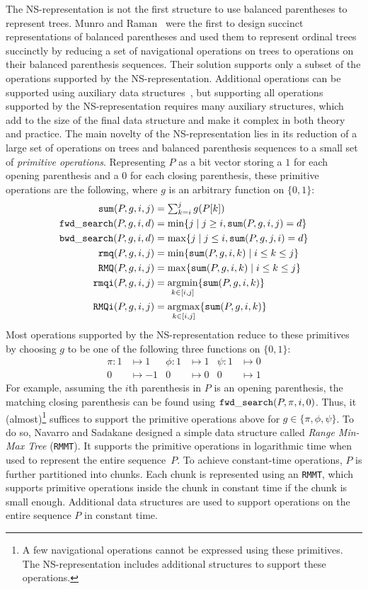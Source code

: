 The NS-representation is not the first structure to use balanced parentheses to
represent trees.
Munro and Raman~\cite{mr1997} were the first to design succinct representations
of balanced parentheses and used them to represent ordinal trees succinctly by
reducing a set of navigational operations on trees to operations on their
balanced parenthesis sequences.
Their solution supports only a subset of the operations supported by the
NS-representation.
Additional operations can be supported using auxiliary data
structures~\cite{ly2008}, but supporting all operations supported by the
NS-representation requires many auxiliary structures, which add to the size
of the final data structure and make it complex in both theory and practice.
The main novelty of the NS-representation lies in its reduction of a large set
of operations on trees and balanced parenthesis sequences to a small set of
\emph{primitive operations}.
Representing $P$ as a bit vector storing a $1$ for each opening parenthesis
and a $0$ for each closing parenthesis, these primitive operations are the
following, where $g$ is an arbitrary function on $\{0,1\}$:
\begin{align*}
\mathtt{sum}(P,g,i,j) &= \textstyle\sum_{k=i}^jg(P[k])\\
\mathtt{fwd\_search}(P,g,i,d) &= \min\{j \mid j \ge i, \mathtt{sum}(P,g,i,j) = d\}\\
\mathtt{bwd\_search}(P,g,i,d) &= \max\{j \mid j \le i, \mathtt{sum}(P,g,j,i) = d\}\\
\mathtt{rmq}(P,g,i,j) &= \min\{\mathtt{sum}(P,g,i,k) \mid i\le k\le j\}\\
\mathtt{RMQ}(P,g,i,j) &= \max\{\mathtt{sum}(P,g,i,k) \mid i\le k\le j\}\\
\mathtt{rmqi}(P,g,i,j) &= \operatorname*{arg\!\min}_{k\in[i,j]}\{\mathtt{sum}(P,g,i,k)\}\\
\mathtt{RMQi}(P,g,i,j) &= \operatorname*{arg\!\max}_{k\in[i,j]}\{\mathtt{sum}(P,g,i,k)\}
\end{align*}
Most operations supported by the NS-representation reduce to these primitives
by choosing $g$ to be one of the following three functions on $\{0,1\}$:
\begin{align*}
\pi : 1 &\mapsto 1 &\phi : 1 &\mapsto 1 & \psi : 1 &\mapsto 0\\
0 &\mapsto -1 & 0 &\mapsto 0 & 0 &\mapsto 1
\end{align*}
For example, assuming the $i$th parenthesis in $P$ is an opening parenthesis,
the matching closing parenthesis can be found using $\mathtt{fwd\_search}(P,\pi,i,0)$.
Thus, it (almost)\footnote{A few navigational operations cannot be expressed
  using these primitives.
  The NS-representation includes additional structures to support these
  operations.}
suffices to support the primitive operations above for
$g \in \{\pi, \phi, \psi\}$.
To do so, Navarro and Sadakane designed a simple data
structure called \emph{Range Min-Max Tree} ({\tt RMMT}).
It supports the primitive operations in logarithmic time when used to represent
the entire sequence~$P$.
To achieve constant-time operations, $P$ is further partitioned into chunks.
Each chunk is represented using an {\tt RMMT}, which supports primitive
operations inside the chunk in constant time if the chunk is small enough.
Additional data structures are used to support operations on the entire sequence
$P$ in constant time.

